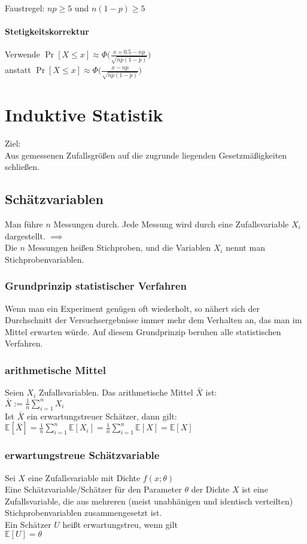 \documentclass[a4paper,9pt]{extarticle}
\begin{document}
Faustregel: $np ≥ 5$ und $n(1-p) ≥ 5$

\paragraph*{Stetigkeitskorrektur}
Verwende $\Pr[X ≤ x] \approx \Phi \Bigg(\frac{x + 0.5 - np}{\sqrt{np(1-p)}}\Bigg)$ \\
anstatt $\Pr[X ≤ x] \approx \Phi \Bigg(\frac{x - np}{\sqrt{np(1-p)}}\Bigg)$

\newpage
\section*{Induktive Statistik}
Ziel: \\
Aus gemessenen Zufallsgrößen auf die zugrunde liegenden Gesetzmäßigkeiten schließen.

\subsection*{Schätzvariablen}
Man führe $n$ Messungen durch. Jede Messung wird durch eine Zufallsvariable $X_i$ dargestellt. $\implies$ \\
Die $n$ Messungen heißen Stichproben, und die Variablen $X_i$ nennt man Stichprobenvariablen.

\subsubsection*{Grundprinzip statistischer Verfahren}
Wenn man ein Experiment genügen oft wiederholt, so nähert sich der Durchschnitt der Versuchsergebnisse immer mehr dem Verhalten an, das man im Mittel erwarten würde.
Auf diesem Grundprinzip beruhen alle statistischen Verfahren.

\subsubsection*{arithmetische Mittel}
Seien $X_i$ Zufallsvariablen. Das arithmetische Mittel $\bar{X}$ ist: \\
$\bar X := \frac 1 n \sum_{i=1}^n X_i$ \\

Ist $\bar X$ ein erwartungstreuer Schätzer, dann gilt: \\
$\mathbb{E}[\bar{X}] = \frac 1 n \sum_{i=1}^n \mathbb{E}[X_i] = \frac 1 n \sum_{i=1}^n \mathbb{E}[X] = \mathbb{E}[X]$

\subsubsection*{erwartungstreue Schätzvariable}
Sei $X$ eine Zufallsvariable mit Dichte $f(x;\theta)$ \\
Eine Schätzvariable/Schätzer für den Parameter $\theta$ der Dichte $X$ ist eine Zufallsvariable, die aus mehreren (meist unabhänigen und identisch verteilten) Stichprobenvariablen zusammengesetzt ist. \\
Ein Schätzer $U$ heißt erwartungstreu, wenn gilt \\
$\mathbb{E}[U] = \theta$ \\
\end{document}
